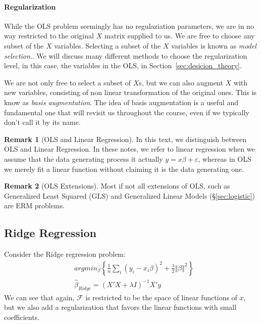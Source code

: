 \documentclass[12pt,a4paper]{article}
\theoremstyle{plain}
\theoremstyle{definition}
\newtheorem{remark}{Remark}
\newcommand{\norm}[1]{\Vert #1 \Vert}
\newcommand{\argmin}[2]{argmin_{#1}\left\{ #2 \right\}}
\newcommand{\hypclass}{\mathcal{F}}
\begin{document}
\paragraph{Regularization}
While the OLS problem seemingly has no regulaziation parameters, we are in no way restricted to the original $X$ matrix supplied to us. 
We are free to choose any subset of the $X$ variables. Selecting a subset of the $X$ variables is known as \emph{model selection}..
We will discuss many different methods to choose the regularization level, in this case, the variables in the OLS, in Section~\ref{sec:desicion_theory}.

We are not only free to select a subset of $X$s, but we can also augment $X$ with new variables, consisting of non linear transformation of the original ones. This is know as \emph{basis augmentation}. 
The idea of basis augmentation is a useful and fundamental one that will revisit us throughout the course, even if we typically don't call it by its name.

\begin{remark}[OLS and Linear Regression]
In this text, we distinguish between OLS and Linear Regression. In these notes, we refer to linear regression when we assume that the data generating process it actually $y=x\beta+\varepsilon$, whereas in OLS we merely fit a linear function without claiming it is the data generating one.
\end{remark}


\begin{remark}[OLS Extensions]
Most if not all extensions of OLS, such as Generalized Least Squared (GLS) and Generalized Linear Models (\S\ref{sec:logistic}) are ERM problems. 
\end{remark}




\subsection{Ridge Regression}
\label{sec:ridge}

Consider the Ridge regression problem:
\begin{align}
\label{eq:ridge}
	& \argmin{\beta}{\frac{1}{n}\sum_i (y_i-x_i\beta)^2 + \frac{\lambda}{2}\norm{\beta}^2} \\
	& \hat{\beta}_{Ridge}= (X'X+\lambda I)^{-1} X'y
\end{align}
We can see that again, $\hypclass$ is restricted to be the space of linear functions of $x$, but we also add a regularization that favors the linear functions with small coefficients.
\end{document}
